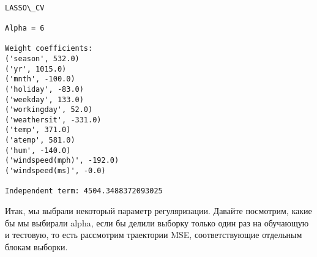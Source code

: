 \documentclass[11pt]{article}
\begin{document}
    \begin{center}
    \end{center}
    { \hspace*{\fill} \\}
    
    \begin{Verbatim}[commandchars=\\\{\}]
LASSO\_CV

Alpha = 6

Weight coefficients:
('season', 532.0)
('yr', 1015.0)
('mnth', -100.0)
('holiday', -83.0)
('weekday', 133.0)
('workingday', 52.0)
('weathersit', -331.0)
('temp', 371.0)
('atemp', 581.0)
('hum', -140.0)
('windspeed(mph)', -192.0)
('windspeed(ms)', -0.0)

Independent term: 4504.3488372093025

    \end{Verbatim}

    Итак, мы выбрали некоторый параметр регуляризации. Давайте посмотрим,
какие бы мы выбирали alpha, если бы делили выборку только один раз на
обучающую и тестовую, то есть рассмотрим траектории MSE, соответствующие
отдельным блокам выборки.
\end{document}

